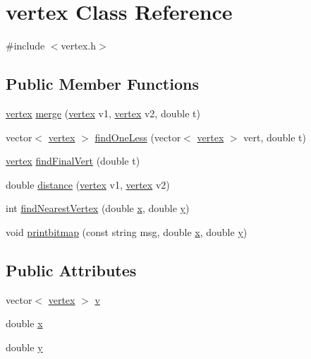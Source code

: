\hypertarget{classvertex}{}\section{vertex Class Reference}
\label{classvertex}


{\ttfamily \#include $<$vertex.\+h$>$}

\subsection*{Public Member Functions}
\begin{DoxyCompactItemize}
\item 
\hyperlink{classvertex}{vertex} \hyperlink{classvertex_aefda2986f4a966108034c7c6db0fd280}{merge} (\hyperlink{classvertex}{vertex} v1, \hyperlink{classvertex}{vertex} v2, double t)
\item 
vector$<$ \hyperlink{classvertex}{vertex} $>$ \hyperlink{classvertex_a202d5209c7340d7669c15e1933e677a0}{find\+One\+Less} (vector$<$ \hyperlink{classvertex}{vertex} $>$ vert, double t)
\item 
\hyperlink{classvertex}{vertex} \hyperlink{classvertex_ab5af4e5840d9caf5599cb51e69c078ef}{find\+Final\+Vert} (double t)
\item 
double \hyperlink{classvertex_a805e0de0af85470e4fbf698d71e6c122}{distance} (\hyperlink{classvertex}{vertex} v1, \hyperlink{classvertex}{vertex} v2)
\item 
int \hyperlink{classvertex_a2e1c5ac0589fae95a9e62f6685037fe6}{find\+Nearest\+Vertex} (double \hyperlink{classvertex_a11f52ec2e920d56500baefe5a2e2bba7}{x}, double \hyperlink{classvertex_a8b9f211498390a67c369fd43f3722a19}{y})
\item 
void \hyperlink{classvertex_ad4edf1c3b1666180030157724c855d58}{printbitmap} (const string msg, double \hyperlink{classvertex_a11f52ec2e920d56500baefe5a2e2bba7}{x}, double \hyperlink{classvertex_a8b9f211498390a67c369fd43f3722a19}{y})
\end{DoxyCompactItemize}
\subsection*{Public Attributes}
\begin{DoxyCompactItemize}
\item 
vector$<$ \hyperlink{classvertex}{vertex} $>$ \hyperlink{classvertex_a3d22584dccb715b7f0d25b73825330ad}{v}
\item 
double \hyperlink{classvertex_a11f52ec2e920d56500baefe5a2e2bba7}{x}
\item 
double \hyperlink{classvertex_a8b9f211498390a67c369fd43f3722a19}{y}
\end{DoxyCompactItemize}


